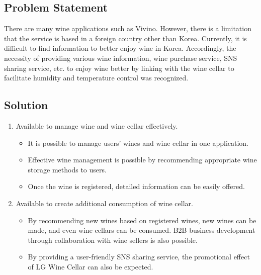 \documentclass[sigconf, nonacm]{acmart}
\begin{document}
\noindent\subsection{Problem Statement}
\indent There are many wine applications such as Vivino. However, there is a limitation that the service is based in a foreign country other than Korea. Currently, it is difficult to find information to better enjoy wine in Korea. Accordingly, the necessity of providing various wine information, wine purchase service, SNS sharing service, etc. to enjoy wine better by linking with the wine cellar to facilitate humidity and temperature control was recognized.\\ 

\noindent\subsection{Solution}
\begin{enumerate}
\item Available to manage wine and wine cellar effectively.
\begin{itemize}
\item It is possible to manage users' wines and wine cellar in one
application.
\item Effective wine management is possible by recommending
appropriate wine storage methods to users.
\item Once the wine is registered, detailed information can be
easily offered.
\end{itemize}
\item Available to create additional consumption of wine cellar. 
\begin{itemize}
\item By recommending new wines based on registered wines,
new wines can be made, and even wine cellars can be
consumed. B2B business development through collaboration
with wine sellers is also possible.
\item By providing a user-friendly SNS sharing service, the
promotional effect of LG Wine Cellar can also be expected.
\end{itemize}
\end{enumerate}
\end{document}

